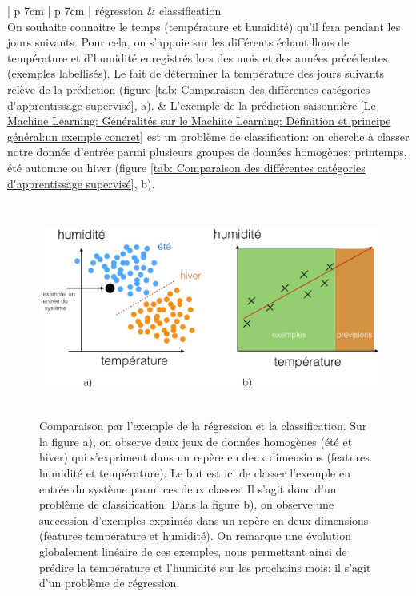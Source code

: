 \begin{table}[H]
	\begin{tabular}{ | p {7cm} | p {7cm} |}
		\hline
		régression & classification \\
		\hline
		On souhaite connaitre le temps (température et humidité) qu'il fera pendant les jours suivants. Pour cela, on s'appuie sur les différents échantillons de température et d'humidité enregistrés lors des mois et des années précédentes (exemples labellisés). Le fait de déterminer la température des jours suivants relève de la prédiction (figure \ref {tab: Comparaison des différentes catégories d'apprentissage supervisé}, a).  
		 &  L'exemple de la prédiction saisonnière \ref{Le Machine Learning: Généralités sur le Machine Learning: Définition et principe général:un exemple concret} est un problème de classification: on cherche à classer notre donnée d'entrée parmi plusieurs groupes de données homogènes: printemps, été automne ou hiver (figure \ref {tab: Comparaison des différentes catégories d'apprentissage supervisé}, b). \\
		\hline 
	\end{tabular}
	\caption[Comparaison des différentes catégories d'apprentissage supervisé]{Comparaison entre l'apprentissage supervisé de type régression et supervisé de type classification}
	\label {tab: Comparaison des différentes catégories d'apprentissage supervisé}
\end{table}

\begin{figure}[h]
	\centering\includegraphics[height=7cm]{images/regression_class.jpeg}
	\caption[Comparaison par l'exemple de la régression et de la classification]{Comparaison par l'exemple de la régression et la classification. Sur la figure a), on observe deux jeux de données homogènes (été et hiver) qui s'expriment dans un repère en deux dimensions (features humidité et température). Le but est ici de classer l'exemple en entrée du système parmi ces deux classes. Il s'agit donc d'un problème de classification. Dans la figure b), on observe une succession d'exemples exprimés dans un repère en deux dimensions (features température et humidité). On remarque une évolution globalement linéaire de ces exemples, nous permettant ainsi de prédire la température et l'humidité sur les prochains mois: il s'agit d'un problème de régression.}
	\label{fig:Comparaison par l'exemple de la régression et la classification}
\end{figure}





